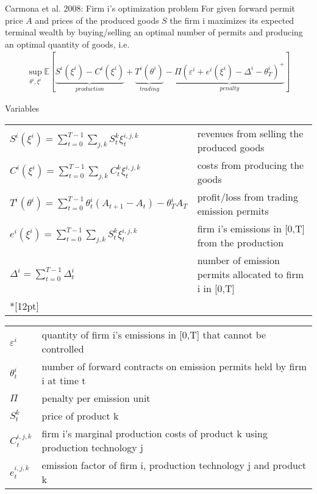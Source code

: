 {Carmona et al. 2008: Firm i's optimization problem}
For given forward permit price $A$ and prices of the produced goods $S$ the firm i maximizes its expected terminal wealth by  buying/selling an optimal number of permits and producing an optimal quantity of goods, i.e.
\begin{align}
\sup_{\theta^i, \xi^i} \mathbb{E} \left[ \underbrace{S^i(\xi^i) - C^i(\xi^i)}_{production} + \underbrace{T^i(\theta^i)}_{trading} - \underbrace{\Pi \left(\varepsilon^i + e^i(\xi^i) - \Delta^i - \theta^i_T \right)^+}_{penalty} \right]
\end{align}

{Variables}

\begin{tiny}
\begin{tabular}{ll}
$S^i(\xi^i) =    \sum_{t=0}^{T-1} \sum_{j, k} S^k_t \xi^{i,j,k}_t$ & revenues from selling the produced goods \\
$C^i(\xi^i) =    \sum_{t=0}^{T-1} \sum_{j, k} C^k_t \xi^{i,j,k}_t$ & costs from producing the goods \\
$T^i(\theta^i) = \sum_{t=0}^{T-1} \theta^i_t (A_{t+1} - A_t) - \theta_T^i A_T$ & profit/loss from trading emission permits \\
$e^i(\xi^i) =    \sum_{t=0}^{T-1} \sum_{j, k} S^k_t \xi^{i,j,k}_t$ & firm i's emissions in [0,T] from the production\\
$\Delta^i = \sum_{t=0}^{T-1} \Delta^i_t$ & number of emission permits allocated to firm i in [0,T] \\*[12pt]
\end{tabular}

\begin{tabular}{ll}
$\varepsilon^i$ & quantity of firm i's emissions in [0,T] that cannot be controlled\\
$\theta^i_t$ & number of forward contracts on emission permits held by firm i at time t\\
$\Pi$ & penalty per emission unit \\
$S_t^k$ & price of product k\\
$C_t^{i,j,k}$ & firm i's marginal production costs of product k using production technology j\\
$e_t^{i,j,k}$ & emission factor of firm i, production technology j and product k \\
\end{tabular}
\end{tiny}


